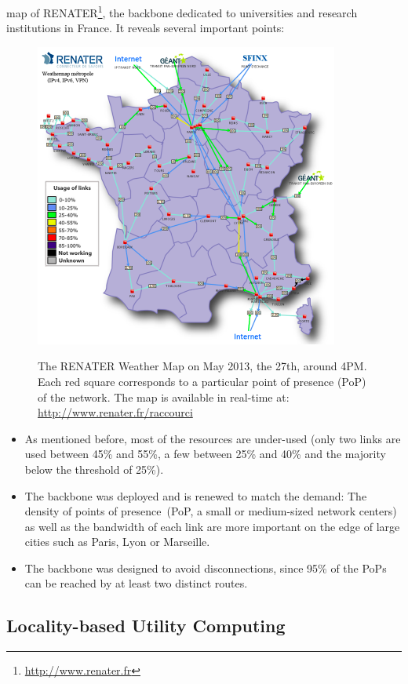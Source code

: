 map of RENATER\footnote{\href{http://www.renater.fr}{http://www.renater.fr}}, the backbone dedicated to universities and research
institutions in France. It reveals several important points: 
\begin{figure}[b]
\vspace*{-.3cm}
\includegraphics[width=10cm]{./FIGS/renater.png}
\label{fig:renater}
\centering\caption{The RENATER Weather Map on May 2013, the 27th, around 4PM.
Each red square corresponds to a particular point of presence (PoP) of the network. The map is available in real-time
at: \href{http://www.renater.fr/raccourci}{http://www.renater.fr/raccourci}}
\vspace*{-.3cm}
\end{figure}


\begin{itemize} 
\item As mentioned before, most of the resources are under-used (only two links are used between 45\% and 55\%, a few between 25\% and 40\% and the majority below the threshold of 25\%). 
\item The backbone was deployed and is renewed to match the demand: The density of
points of presence~(PoP, \ie a small or medium-sized network centers) as well as the bandwidth of each link are more important on the edge of large cities such as Paris, Lyon or
Marseille. 
\item The backbone was designed to avoid disconnections, since 95\% of the PoPs can be reached by at least two distinct routes.
\end{itemize}


\subsection{Locality-based Utility Computing}


